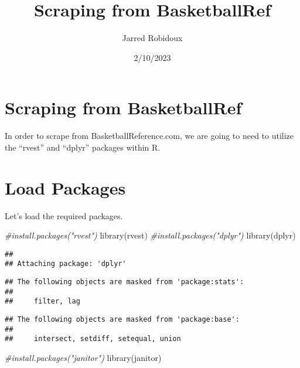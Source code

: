 \documentclass[
]{article}
\title{Scraping from BasketballRef}
\author{Jarred Robidoux}
\date{2/10/2023}
\newenvironment{Shaded}{\begin{snugshade}}{\end{snugshade}}
\newcommand{\CommentTok}[1]{\textcolor[rgb]{0.56,0.35,0.01}{\textit{#1}}}
\newcommand{\FunctionTok}[1]{\textcolor[rgb]{0.00,0.00,0.00}{#1}}
\newcommand{\NormalTok}[1]{#1}
\begin{document}
\maketitle

\hypertarget{scraping-from-basketballref}{%
\section{\texorpdfstring{\textbf{Scraping from
BasketballRef}}{Scraping from BasketballRef}}\label{scraping-from-basketballref}}

In order to scrape from BasketballReference.com, we are going to need to
utilize the ``rvest'' and ``dplyr'' packages within R.

\hypertarget{load-packages}{%
\section{\texorpdfstring{\textbf{Load
Packages}}{Load Packages}}\label{load-packages}}

Let's load the required packages.

\begin{Shaded}
\begin{Highlighting}[]
\CommentTok{\#install.packages("rvest")}
\FunctionTok{library}\NormalTok{(rvest)}
\CommentTok{\#install.packages("dplyr")}
\FunctionTok{library}\NormalTok{(dplyr)}
\end{Highlighting}
\end{Shaded}

\begin{verbatim}
## 
## Attaching package: 'dplyr'
\end{verbatim}

\begin{verbatim}
## The following objects are masked from 'package:stats':
## 
##     filter, lag
\end{verbatim}

\begin{verbatim}
## The following objects are masked from 'package:base':
## 
##     intersect, setdiff, setequal, union
\end{verbatim}

\begin{Shaded}
\begin{Highlighting}[]
\CommentTok{\#install.packages("janitor")}
\FunctionTok{library}\NormalTok{(janitor)}
\end{Highlighting}
\end{Shaded}
\end{document}

